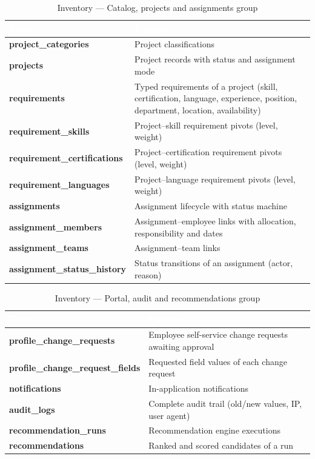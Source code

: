 \documentclass{bts-report}
\begin{document}
\begin{table}[H]
  \centering
  \caption{Inventory --- Catalog, projects and assignments group}
  \label{tab:inv-project}
  \begin{tabularx}{\textwidth}{|>{\bfseries}p{4.4cm}|X|}
    \hline
    \rowcolor{tableheader}
    \textcolor{white}{\textbf{Table}} & \textcolor{white}{\textbf{Purpose}} \\
    \hline
    project\_categories & Project classifications \\ \hline
    projects & Project records with status and assignment mode \\ \hline
    requirements & Typed requirements of a project (skill, certification, language, experience, position, department, location, availability) \\ \hline
    requirement\_skills & Project--skill requirement pivots (level, weight) \\ \hline
    requirement\_certifications & Project--certification requirement pivots (level, weight) \\ \hline
    requirement\_languages & Project--language requirement pivots (level, weight) \\ \hline
    assignments & Assignment lifecycle with status machine \\ \hline
    assignment\_members & Assignment--employee links with allocation, responsibility and dates \\ \hline
    assignment\_teams & Assignment--team links \\ \hline
    assignment\_status\_history & Status transitions of an assignment (actor, reason) \\ \hline
  \end{tabularx}
\end{table}

\begin{table}[H]
  \centering
  \caption{Inventory --- Portal, audit and recommendations group}
  \label{tab:inv-portal}
  \begin{tabularx}{\textwidth}{|>{\bfseries}p{4.4cm}|X|}
    \hline
    \rowcolor{tableheader}
    \textcolor{white}{\textbf{Table}} & \textcolor{white}{\textbf{Purpose}} \\
    \hline
    profile\_change\_requests & Employee self-service change requests awaiting approval \\ \hline
    profile\_change\_request\_fields & Requested field values of each change request \\ \hline
    notifications & In-application notifications \\ \hline
    audit\_logs & Complete audit trail (old/new values, IP, user agent) \\ \hline
    recommendation\_runs & Recommendation engine executions \\ \hline
    recommendations & Ranked and scored candidates of a run \\ \hline
  \end{tabularx}
\end{table}
\end{document}
